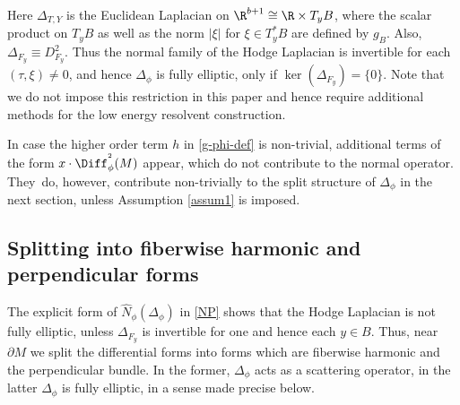 Here $\Delta_{T,Y}$ is the Euclidean Laplacian on $\R^{b+1}\cong\R\times T_yB$, where the scalar product on $T_yB$ as well as the norm $ \vert \xi\vert$ for $\xi\in T^*_{y}B$ are defined by $g_B$. Also, $\Delta_{F_y} \equiv D^2_{F_y}$.
Thus the normal family of the Hodge Laplacian is invertible for each $(\tau,\xi) \neq 0$,
and hence $\Delta_{\phi}$ is fully elliptic, only if $\ker(\Delta_{F_y}) = \{0\}$. Note that we do not
impose this restriction in this paper and hence require additional methods for the low energy resolvent construction.

\begin{Rem}
In case the higher order term $h$ in \eqref{g-phi-def}
is non-trivial, additional terms of the form $x\cdot \Diff^{^2}_{\phi}(M)$
appear, which do not contribute to the normal operator. They~do, however,
contribute non-trivially to the split structure of $\Delta_{\phi}$ in the next section,
unless Assumption \ref{assum1} is imposed.
\end{Rem}

\subsection{Splitting into fiberwise harmonic and perpendicular forms}

The explicit form of $\widehat{N}_\phi(\Delta_{\phi})$ in \eqref{NP} shows that the
Hodge Laplacian is not fully elliptic, unless $\Delta_{F_y}$ is invertible for one and hence each $y\in B$. Thus,
near $\partial M$ we split the differential forms into forms which are fiberwise harmonic and
the perpendicular bundle. In the former, $\Delta_{\phi}$
acts as a scattering operator, in the latter $\Delta_{\phi}$ is fully elliptic, in a sense made precise below.

